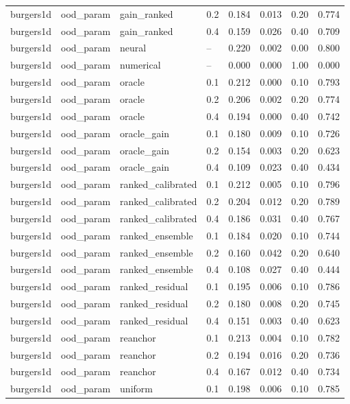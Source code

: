 \begin{longtable}{llllrrrr}
burgers1d & ood\_param & gain\_ranked & 0.2 & 0.184 & 0.013 & 0.20 & 0.774 \\
burgers1d & ood\_param & gain\_ranked & 0.4 & 0.159 & 0.026 & 0.40 & 0.709 \\
burgers1d & ood\_param & neural & -- & 0.220 & 0.002 & 0.00 & 0.800 \\
burgers1d & ood\_param & numerical & -- & 0.000 & 0.000 & 1.00 & 0.000 \\
burgers1d & ood\_param & oracle & 0.1 & 0.212 & 0.000 & 0.10 & 0.793 \\
burgers1d & ood\_param & oracle & 0.2 & 0.206 & 0.002 & 0.20 & 0.774 \\
burgers1d & ood\_param & oracle & 0.4 & 0.194 & 0.000 & 0.40 & 0.742 \\
burgers1d & ood\_param & oracle\_gain & 0.1 & 0.180 & 0.009 & 0.10 & 0.726 \\
burgers1d & ood\_param & oracle\_gain & 0.2 & 0.154 & 0.003 & 0.20 & 0.623 \\
burgers1d & ood\_param & oracle\_gain & 0.4 & 0.109 & 0.023 & 0.40 & 0.434 \\
burgers1d & ood\_param & ranked\_calibrated & 0.1 & 0.212 & 0.005 & 0.10 & 0.796 \\
burgers1d & ood\_param & ranked\_calibrated & 0.2 & 0.204 & 0.012 & 0.20 & 0.789 \\
burgers1d & ood\_param & ranked\_calibrated & 0.4 & 0.186 & 0.031 & 0.40 & 0.767 \\
burgers1d & ood\_param & ranked\_ensemble & 0.1 & 0.184 & 0.020 & 0.10 & 0.744 \\
burgers1d & ood\_param & ranked\_ensemble & 0.2 & 0.160 & 0.042 & 0.20 & 0.640 \\
burgers1d & ood\_param & ranked\_ensemble & 0.4 & 0.108 & 0.027 & 0.40 & 0.444 \\
burgers1d & ood\_param & ranked\_residual & 0.1 & 0.195 & 0.006 & 0.10 & 0.786 \\
burgers1d & ood\_param & ranked\_residual & 0.2 & 0.180 & 0.008 & 0.20 & 0.745 \\
burgers1d & ood\_param & ranked\_residual & 0.4 & 0.151 & 0.003 & 0.40 & 0.623 \\
burgers1d & ood\_param & reanchor & 0.1 & 0.213 & 0.004 & 0.10 & 0.782 \\
burgers1d & ood\_param & reanchor & 0.2 & 0.194 & 0.016 & 0.20 & 0.736 \\
burgers1d & ood\_param & reanchor & 0.4 & 0.167 & 0.012 & 0.40 & 0.734 \\
burgers1d & ood\_param & uniform & 0.1 & 0.198 & 0.006 & 0.10 & 0.785 \\

\end{longtable}
